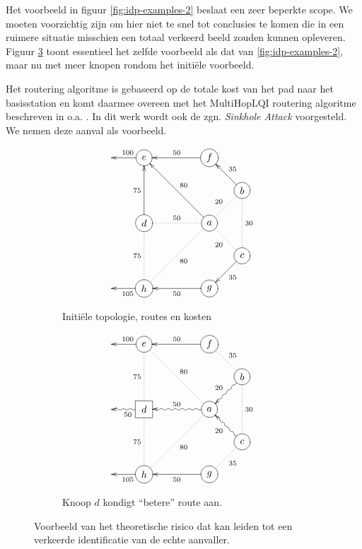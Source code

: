 Het voorbeeld in figuur \ref{fig:idp-examples-2} beslaat een zeer beperkte
scope. We moeten voorzichtig zijn om hier niet te snel tot conclusies te komen
die in een ruimere situatie misschien een totaal verkeerd beeld zouden kunnen
opleveren. Figuur \ref{fig:sinkhole-ripple} toont essentieel het zelfde
voorbeeld als dat van \ref{fig:idp-examples-2}, maar nu met meer knopen rondom
het initi\"ele voorbeeld.

Het routering algoritme is gebaseerd op de totale kost van het pad naar het
basisstation en komt daarmee overeen met het MultiHopLQI routering algoritme
beschreven in o.a. \citep{krontiris2008launching}. In dit werk wordt ook de zgn.
\emph{Sinkhole Attack} voorgesteld. We nemen deze aanval als voorbeeld.

\begin{figure}[ht]
\centering
\begin{subfigure}{.49\textwidth}
  \centering
\[ \entrymodifiers={-=++[o][F]}
 \xymatrix@!=0.75pc {
*{} & e \ar@{->}[l]_{100} & *{} & f \ar@{->}[ll]_{50}   & *{} \\
*{} & *{} & *{} &  *{} & b \ar@{->}[lu]_{35} \ar@{.}[ld]_{20} \ar@{.}[dd]^{30}  \\
*{} & d \ar@{->}[uu]^{75} \ar@{.}[dd]_{75}  & *{} &    a \ar@{->}[lluu]_{80} \ar@{.}[lldd]^{80} \ar@{.}[ll]_{50} & *{} \\
*{} & *{} & *{} &  *{} & c \ar@{.}[lu]^{20} \ar@{->}[ld]^{35} \\
*{} & h \ar@{->}[l]^{105}  & *{} &  g \ar@{->}[ll]^{50}  & *{} \\
  }
\]
  \caption{Initi\"ele topologie, routes en kosten}
  \label{fig:sinkhole-ripple-1}
\end{subfigure}
\begin{subfigure}{.49\textwidth}
  \centering
\[ \entrymodifiers={-=++[o][F]}
 \xymatrix@!=0.75pc {
*{} & e \ar@{->}[l]_{100} & *{} & f \ar@{->}[ll]_{50}   & *{} \\
*{} & *{} & *{} &  *{} & b \ar@{.}[lu]_{35} \ar@{~>}[ld]_{20} \ar@{.}[dd]^{30}  \\
*{} & *-=++[F]{d} \ar@{~>}[l]^{50} \ar@{.}[uu]^{75} \ar@{.}[dd]_{75}  & *{} &    a \ar@{.}[lluu]_{80} \ar@{.}[lldd]^{80} \ar@{~>}[ll]_{50} & *{} \\
*{} & *{} & *{} &  *{} & c \ar@{~>}[lu]^{20} \ar@{.}[ld]^{35} \\
*{} & h \ar@{->}[l]^{105}  & *{} &  g \ar@{->}[ll]^{50}  & *{} \\
  }
\]
  \caption{Knoop $d$ kondigt ``betere'' route aan.}
  \label{fig:sinkhole-ripple-2}
\end{subfigure}
\caption{Voorbeeld van het theoretische risico dat kan leiden tot een verkeerde
identificatie van de echte aanvaller.}
\label{fig:sinkhole-ripple}
\end{figure}

